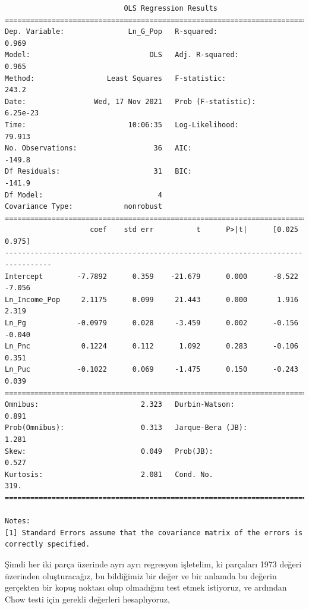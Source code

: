 \documentclass[12pt,fleqn]{article}\usepackage{../../common}
\begin{document}
\begin{verbatim}
                            OLS Regression Results                            
==============================================================================
Dep. Variable:               Ln_G_Pop   R-squared:                       0.969
Model:                            OLS   Adj. R-squared:                  0.965
Method:                 Least Squares   F-statistic:                     243.2
Date:                Wed, 17 Nov 2021   Prob (F-statistic):           6.25e-23
Time:                        10:06:35   Log-Likelihood:                 79.913
No. Observations:                  36   AIC:                            -149.8
Df Residuals:                      31   BIC:                            -141.9
Df Model:                           4                                         
Covariance Type:            nonrobust                                         
=================================================================================
                    coef    std err          t      P>|t|      [0.025      0.975]
---------------------------------------------------------------------------------
Intercept        -7.7892      0.359    -21.679      0.000      -8.522      -7.056
Ln_Income_Pop     2.1175      0.099     21.443      0.000       1.916       2.319
Ln_Pg            -0.0979      0.028     -3.459      0.002      -0.156      -0.040
Ln_Pnc            0.1224      0.112      1.092      0.283      -0.106       0.351
Ln_Puc           -0.1022      0.069     -1.475      0.150      -0.243       0.039
==============================================================================
Omnibus:                        2.323   Durbin-Watson:                   0.891
Prob(Omnibus):                  0.313   Jarque-Bera (JB):                1.281
Skew:                           0.049   Prob(JB):                        0.527
Kurtosis:                       2.081   Cond. No.                         319.
==============================================================================

Notes:
[1] Standard Errors assume that the covariance matrix of the errors is correctly specified.
\end{verbatim}

Şimdi her iki parça üzerinde ayrı ayrı regresyon işletelim, ki parçaları
1973 değeri üzerinden oluşturacağız, bu bildiğimiz bir değer ve bir anlamda
bu değerin gerçekten bir kopuş noktası olup olmadığını test etmek
istiyoruz, ve ardından Chow testi için gerekli değerleri hesaplıyoruz,
\end{document}
